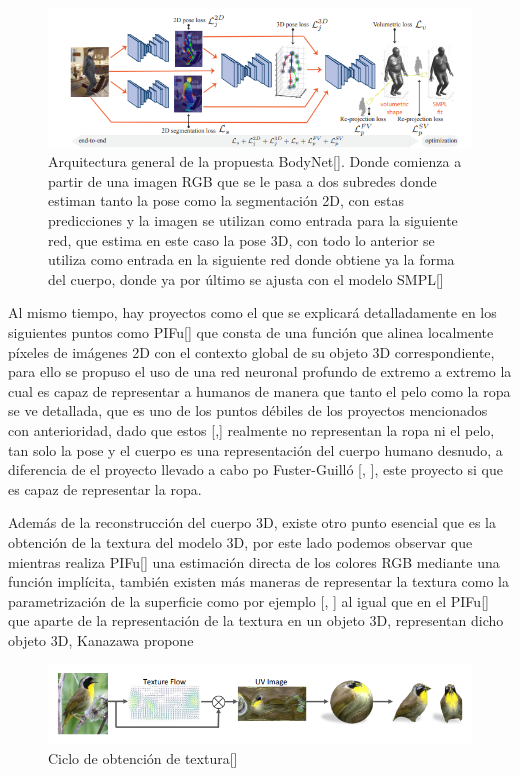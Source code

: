 \begin{figure}[!h]
	\centering
	\includegraphics[scale=0.6]{imagenes/estadoarte4.png}
	\caption{ Arquitectura general de la propuesta BodyNet[\cite{bodynet}]. Donde comienza a partir de una imagen RGB que se le pasa a dos subredes donde estiman tanto la pose como la segmentación 2D, con estas predicciones y la imagen se utilizan como  entrada para la siguiente red, que estima en este caso la pose 3D, con todo lo anterior se utiliza como entrada en la siguiente red donde obtiene ya la forma del cuerpo, donde ya por último se ajusta con el modelo SMPL[\cite{smpl}]}
	\label{fig:figura5}
\end{figure}

Al mismo tiempo, hay proyectos como el que se explicará detalladamente en los siguientes puntos como PIFu[\cite{pifu}] que consta de una función que alinea localmente píxeles de imágenes 2D con el contexto global de su objeto 3D correspondiente, para ello se propuso el uso de una red neuronal profundo de extremo a extremo la cual es capaz de representar a humanos de manera que tanto el pelo como la ropa se ve detallada, que es uno de los puntos débiles de los proyectos mencionados con anterioridad, dado que estos [\cite{keepsmpl},\cite{pymaf}] realmente no representan la ropa ni el pelo, tan solo la pose y el cuerpo es una representación del cuerpo humano desnudo, a diferencia de el proyecto llevado a cabo po Fuster-Guilló [\cite{Andres1}, \cite{Nahuel1}], este proyecto si que es capaz de representar la ropa.

Además de la reconstrucción del cuerpo 3D, existe otro punto esencial que es la obtención de la textura del modelo 3D, por este lado podemos observar que mientras realiza PIFu[\cite{pifu}] una estimación directa de los colores RGB mediante una función implícita, también existen más maneras de representar la textura como la parametrización de la superficie como por ejemplo [\cite{texture1}, \cite{densepose}] al igual que en el PIFu[\cite{pifu}] que aparte de la representación de la textura en un objeto 3D, representan dicho objeto 3D, Kanazawa propone 
\begin{figure}[!h]
	\centering
	\includegraphics[scale=0.6]{imagenes/estadoarte5.png}
	\caption{Ciclo de obtención de textura[\cite{texture1}]}
	\label{fig:figura6}
\end{figure}

